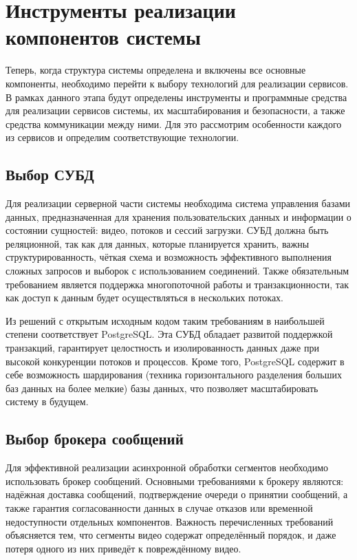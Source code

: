 \section{Инструменты реализации компонентов системы}

	Теперь, когда структура системы определена и включены все основные компоненты, необходимо перейти к выбору технологий для реализации сервисов. В рамках данного этапа будут определены инструменты и программные средства для реализации сервисов системы, их масштабирования и безопасности, а также средства коммуникации между ними. Для это рассмотрим особенности каждого из сервисов и определим соответствующие технологии.

	\subsection{Выбор СУБД}

	Для реализации серверной части системы необходима система управления базами данных, предназначенная для хранения пользовательских данных и информации о состоянии сущностей: видео, потоков и сессий загрузки. СУБД должна быть реляционной, так как для данных, которые планируется хранить, важны структурированность, чёткая схема и возможность эффективного выполнения сложных запросов и выборок с использованием соединений. Также обязательным требованием является поддержка многопоточной работы и транзакционности, так как доступ к данным будет осуществляться в нескольких потоках.

	Из решений с открытым исходным кодом таким требованиям в наибольшей степени соответствует PostgreSQL. Эта СУБД обладает развитой поддержкой транзакций, гарантирует целостность и изолированность данных даже при высокой конкуренции потоков и процессов. Кроме того, PostgreSQL содержит в себе возможность шардирования (техника горизонтального разделения больших баз данных на более мелкие) базы данных, что позволяет масштабировать систему в будущем.

	\subsection{Выбор брокера сообщений}

	Для эффективной реализации асинхронной обработки сегментов необходимо использовать брокер сообщений. Основными требованиями к брокеру являются: надёжная доставка сообщений, подтверждение очереди о принятии сообщений, а также гарантия согласованности данных в случае отказов или временной недоступности отдельных компонентов. Важность перечисленных требований объясняется тем, что сегменты видео содержат определённый порядок, и даже потеря одного из них приведёт к повреждённому видео.

